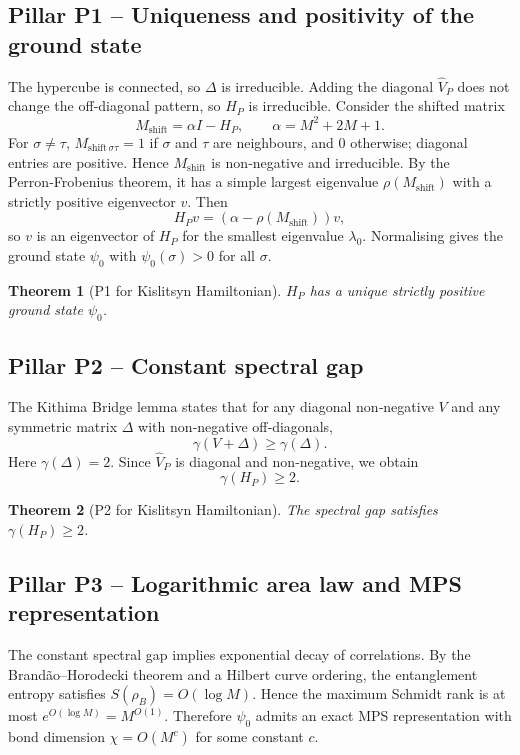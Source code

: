 \documentclass[11pt,a4paper]{article}
\newtheorem{theorem}{Theorem}[section]
\begin{document}
\subsection{Pillar P1 – Uniqueness and positivity of the ground state}
The hypercube is connected, so $\Delta$ is irreducible. Adding the diagonal $\hat{V}_P$ does not change the off‑diagonal pattern, so $H_P$ is irreducible. Consider the shifted matrix
\[
M_{\text{shift}} = \alpha I - H_P,\qquad \alpha = M^2 + 2M + 1.
\]
For $\sigma\neq\tau$, $M_{\text{shift}\,\sigma\tau} = 1$ if $\sigma$ and $\tau$ are neighbours, and $0$ otherwise; diagonal entries are positive. Hence $M_{\text{shift}}$ is non‑negative and irreducible. By the Perron‑Frobenius theorem, it has a simple largest eigenvalue $\rho(M_{\text{shift}})$ with a strictly positive eigenvector $v$. Then
\[
H_P v = (\alpha - \rho(M_{\text{shift}})) v,
\]
so $v$ is an eigenvector of $H_P$ for the smallest eigenvalue $\lambda_0$. Normalising gives the ground state $\psi_0$ with $\psi_0(\sigma) > 0$ for all $\sigma$.

\begin{theorem}[P1 for Kislitsyn Hamiltonian]
$H_P$ has a unique strictly positive ground state $\psi_0$.
\end{theorem}

\subsection{Pillar P2 – Constant spectral gap}
The Kithima Bridge lemma states that for any diagonal non‑negative $V$ and any symmetric matrix $\Delta$ with non‑negative off‑diagonals,
\[
\gamma(V + \Delta) \ge \gamma(\Delta).
\]
Here $\gamma(\Delta) = 2$. Since $\hat{V}_P$ is diagonal and non‑negative, we obtain
\[
\gamma(H_P) \ge 2.
\]

\begin{theorem}[P2 for Kislitsyn Hamiltonian]
The spectral gap satisfies $\gamma(H_P) \ge 2$.
\end{theorem}

\subsection{Pillar P3 – Logarithmic area law and MPS representation}
The constant spectral gap implies exponential decay of correlations. By the Brandão–Horodecki theorem and a Hilbert curve ordering, the entanglement entropy satisfies $S(\rho_B) = O(\log M)$. Hence the maximum Schmidt rank is at most $e^{O(\log M)} = M^{O(1)}$. Therefore $\psi_0$ admits an exact MPS representation with bond dimension $\chi = O(M^c)$ for some constant $c$.
\end{document}
